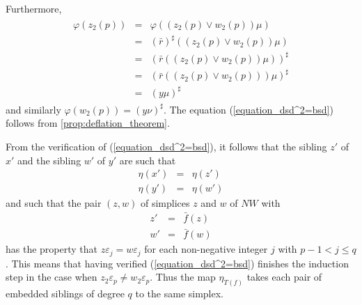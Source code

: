 Furthermore,
\begin{equation}
\label{eq:motivating_lemma_property_of_regular_simplicial_set}
\begin{gathered}
\begin{array}{rcl}
\varphi (z_2(p)) & = & \varphi ((z_2(p)\vee w_2(p))\mu ) \\
& = & (\bar{r} )^\sharp ((z_2(p)\vee w_2(p))\mu ) \\
& = & (\bar{r} ((z_2(p)\vee w_2(p))\mu ))^\sharp \\
& = & (\bar{r} ((z_2(p)\vee w_2(p)))\mu )^\sharp \\
& = & (y\mu )^\sharp
\end{array}
\end{gathered}
\end{equation}
and similarly $\varphi (w_2(p))=(y\nu )^\sharp$. The equation (\ref{equation_dsd^2=bsd}) follows from \cref{prop:deflation_theorem}.

From the verification of (\ref{equation_dsd^2=bsd}), it follows that the sibling $z'$ of $x'$ and the sibling $w'$ of $y'$ are such that
\begin{displaymath}
\begin{array}{rcl}
\eta (x') & = & \eta (z') \\
\eta (y') & = & \eta (w')
\end{array}
\end{displaymath}
and such that the pair $(z,w)$ of simplices $z$ and $w$ of $NW$ with
\begin{displaymath}
\begin{array}{rcl}
z' & = & \bar{f} (z) \\
w' & = & \bar{f} (w)
\end{array}
\end{displaymath}
has the property that $z\varepsilon _j=w\varepsilon _j$ for each non-negative integer $j$ with $p-1<j\leq q$. This means that having verified (\ref{equation_dsd^2=bsd}) finishes the induction step in the case when $z_2\varepsilon _p\neq w_2\varepsilon _p$. Thus the map $\eta _{T(f)}$ takes each pair of embedded siblings of degree $q$ to the same simplex.

